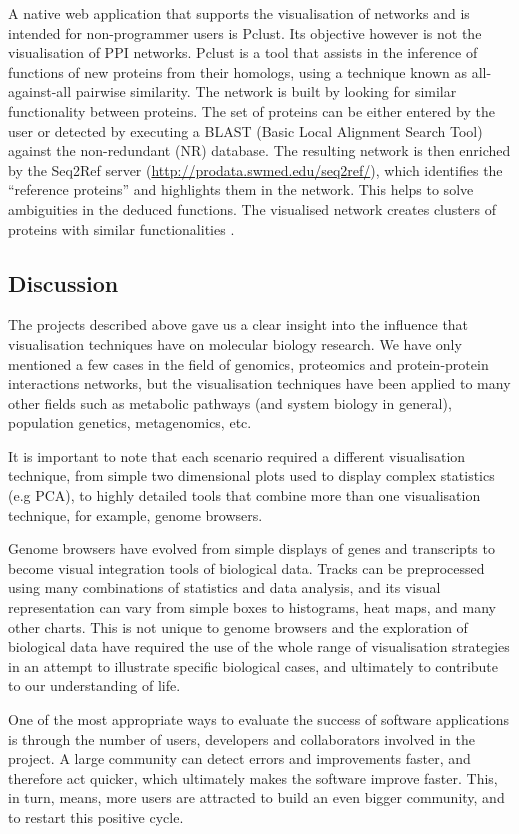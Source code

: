 A native web application that supports the visualisation of networks and is intended for non-programmer users is Pclust. Its objective however is not the visualisation of PPI networks. Pclust is a tool that assists in the inference of functions of new proteins from their homologs, using a technique known as all-against-all pairwise similarity. The network is built by looking for similar functionality between proteins. The set of proteins can be either entered by the user or detected by executing a BLAST (Basic Local Alignment Search Tool) against the non-redundant (NR) database. The resulting network is then enriched by the Seq2Ref server (\url{http://prodata.swmed.edu/seq2ref/}), which identifies the ``reference proteins'' and highlights them in the network. This helps to solve ambiguities in the deduced functions. The visualised network creates clusters of proteins with similar functionalities \cite{Li2013}.


\subsection{Discussion} \label{sec:intro-discusion}
The projects described above gave us a clear insight into the influence that visualisation techniques have on molecular biology research. We have only mentioned a few cases in the field of genomics, proteomics and protein-protein interactions networks, but the visualisation techniques have been applied to many other fields such as metabolic pathways (and system biology in general), population genetics, metagenomics, etc.

It is important to note that each scenario required a different visualisation technique, from simple two dimensional plots used to display complex statistics (e.g PCA), to highly detailed tools that combine more than one visualisation technique, for example, genome browsers.

Genome browsers have evolved from simple displays of genes and transcripts to become visual integration tools of biological data. Tracks can be preprocessed using many combinations of statistics and data analysis, and its visual representation can vary from simple boxes to histograms, heat maps, and many other charts. This is not unique to genome browsers and the exploration of biological data have required the use of the whole range of visualisation strategies in an attempt to illustrate specific biological cases, and ultimately to contribute to our understanding of life.

One of the most appropriate ways to evaluate the success of software applications is through the number of users, developers and collaborators involved in the project. A large community can detect errors and improvements faster, and therefore act quicker, which ultimately makes the software improve faster. This, in turn, means, more users are attracted to build an even bigger community, and to restart this positive cycle.

